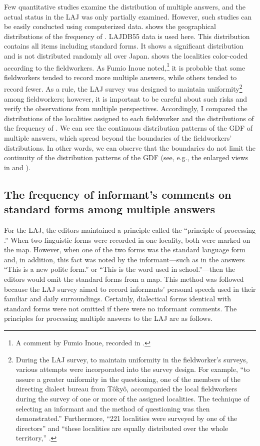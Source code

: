 \documentclass[output=paper]{LSP/langsci}
\begin{document}
Few quantitative studies examine the distribution of multiple answers, and the actual status in the LAJ was only partially examined. However, such studies can be easily conducted using computerized data.  shows the geographical distributions of the frequency of . LAJDB55 data is used here. This distribution contains all items including standard forms. It shows a significant distribution and is not distributed randomly all over Japan.  shows the localities color-coded according to the fieldworkers. As Fumio Inoue noted,\footnote{ A comment by Fumio Inoue, recorded in \citet[6]{inagaki_hogen_1980}.} it is probable that some fieldworkers tended to record more multiple answers, while others tended to record fewer. As a rule, the LAJ survey was designed to maintain uniformity\footnote{ During the LAJ survey, to maintain uniformity in the fieldworker’s surveys, various attempts were incorporated into the survey design. For example, “to assure a greater uniformity in the questioning, one of the members of the directing dialect bureau from Tôkyô, accompanied the local fieldworkers during the survey of one or more of the assigned localities. The technique of selecting an informant and the method of questioning was then demonstrated.” Furthermore, “221 localities were surveyed by one of the directors” and “these localities are equally distributed over the whole territory,” \citep[23, 40--41]{kokuritsu_kokugo_kenkyujo_nlri_nihon_1966}.} among fieldworkers; however, it is important to be careful about such risks and verify the observations from multiple perspectives. Accordingly, I compared the distributions of the localities assigned to each fieldworker and the distributions of the frequency of . We can see the continuous distribution patterns of the GDF of multiple answers, which spread beyond the boundaries of the fieldworkers’ distributions. In other words, we can observe that the boundaries do not limit the continuity of the distribution patterns of the GDF (see, e.g., the enlarged views in  and ).

\subsection{The frequency of informant’s comments on standard forms among multiple answers}
For the LAJ, the editors maintained a principle called the “principle of processing .” When two linguistic forms were recorded in one locality, both were marked on the map. However, when one of the two forms was the standard language form and, in addition, this fact was noted by the informant—such as in the answers “This is a new polite form.” or “This is the word used in school.”—then the editors would omit the standard forms from a map. This method was followed because the LAJ survey aimed to record informants’ personal speech used in their familiar and daily surroundings. Certainly, dialectical forms identical with standard forms were not omitted if there were no informant comments. The principles for processing multiple answers to the LAJ are as follows.
\end{document}
